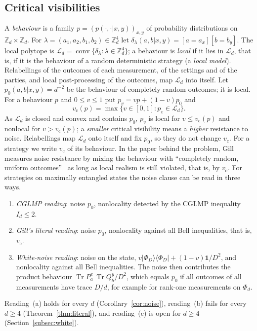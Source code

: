 \documentclass[11pt]{amsart}
\theoremstyle{definition}
\theoremstyle{remark}
\numberwithin{equation}{section}
\newcommand{\Z}{\mathbb{Z}}
\newcommand{\Tr}{\operatorname{Tr}}
\newcommand{\one}{\mathbf{1}}
\newcommand{\cL}{\mathcal{L}}
\newcommand{\vc}{v_{\mathrm c}}
\begin{document}
\subsection{Critical visibilities}\label{subsec:noisesetting}
A \emph{behaviour} is a family $p=(p(\cdot,\cdot|x,y))_{x,y}$ of probability distributions on $\Z_d\times\Z_d$. For
$\lambda=(a_1,a_2,b_1,b_2)\in\Z_d^4$ let $\delta_\lambda(a,b|x,y)=[a=a_x][b=b_y]$. The local polytope is
$\cL_d=\operatorname{conv}\{\delta_\lambda:\lambda\in\Z_d^4\}$; a behaviour is \emph{local} if it lies in $\cL_d$, that
is, if it is the behaviour of a random deterministic strategy (a \emph{local model}). Relabellings of the outcomes of
each measurement, of the settings and of the parties, and local post-processing of the outcomes, map $\cL_d$ into
itself. Let $p_0(a,b|x,y)=d^{-2}$ be the behaviour of completely random outcomes; it is local. For a behaviour $p$ and
$0\le v\le1$ put $p_v=vp+(1-v)p_0$ and
\[
\vc(p)=\max\{v\in[0,1]:p_v\in\cL_d\}.
\]
As $\cL_d$ is closed and convex and contains $p_0$, $p_v$ is local for $v\le\vc(p)$ and nonlocal for $v>\vc(p)$; a
\emph{smaller} critical visibility means a \emph{higher} resistance to noise. Relabellings map $\cL_d$ onto itself and
fix $p_0$, so they do not change $\vc$. For a strategy we write $\vc$ of its behaviour. In the paper behind the
problem, Gill measures noise resistance by mixing the behaviour with ``completely random, uniform
outcomes''~\cite[p.~140]{Gill} as long as local realism is still violated, that is, by $\vc$. For strategies on
maximally entangled states the noise clause can be read in three ways.
\begin{enumerate}
\item[(a)] \emph{CGLMP reading}: noise $p_0$, nonlocality detected by the CGLMP inequality $I_d\le2$.
\item[(b)] \emph{Gill's literal reading}: noise $p_0$, nonlocality against all Bell inequalities, that is, $\vc$.
\item[(c)] \emph{White-noise reading}: noise on the state, $v|\Phi_D\rangle\langle\Phi_D|+(1-v)\one/D^2$, and
nonlocality against all Bell inequalities. The noise then contributes the product behaviour
$\Tr P^x_a\,\Tr Q^y_b/D^2$, which equals $p_0$ if all outcomes of all measurements have trace $D/d$, for example for
rank-one measurements on $\Phi_d$.
\end{enumerate}
Reading~(a) holds for every $d$ (Corollary~\ref{cor:noise}), reading~(b) fails for every $d\ge4$
(Theorem~\ref{thm:literal}), and reading~(c) is open for $d\ge4$ (Section~\ref{subsec:white}).
\end{document}
